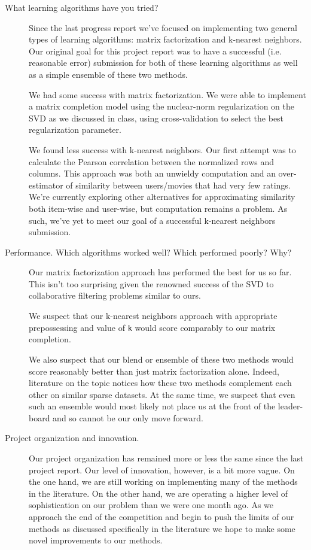 \documentclass[oneside]{article}
\begin{document}
\begin{description}
\item[What learning algorithms have you tried?] 
Since the last progress report we've focused on implementing two general types of learning algorithms: matrix factorization and k-nearest neighbors. Our original goal for this project report was to have a successful (i.e. reasonable error) submission for both of these learning algorithms as well as a simple ensemble of these two methods.

We had some success with matrix factorization. We were able to implement a matrix completion model using the nuclear-norm regularization on the SVD as we discussed in class, using cross-validation to select the best regularization parameter.

We found less success with k-nearest neighbors. Our first attempt was to calculate the Pearson correlation between the normalized rows and columns. This approach was both an unwieldy computation and an over-estimator of similarity between users/movies that had very few ratings. We're currently exploring other alternatives for approximating similarity both item-wise and user-wise, but computation remains a problem. As such, we've yet to meet our goal of a successful k-nearest neighbors submission.

\item[Performance. Which algorithms worked well? Which performed poorly? Why?]
Our matrix factorization approach has performed the best for us so far. This isn't too surprising given the renowned success of the SVD to collaborative filtering problems similar to ours. 

We suspect that our k-nearest neighbors approach with appropriate prepossessing and  value of \verb|k| would score comparably to our matrix completion. 

We also suspect that our blend or ensemble of these two methods would score reasonably better than just matrix factorization alone. Indeed, literature on the topic notices how these two methods complement each other on similar sparse datasets. At the same time, we suspect that even such an ensemble would most likely not place us at the front of the leader-board and so cannot be our only move forward. 

\item[Project organization and innovation.] 
Our project organization has remained more or less the same since the last project report. Our level of innovation, however, is a bit more vague. On the one hand, we are still working on implementing many of the methods in the literature. On the other hand, we are operating a higher level of sophistication on our problem than we were one month ago. As we approach the end of the competition and begin to push the limits of our methods as discussed specifically in the literature we hope to make some novel improvements to our methods. 


\end{description}
\end{document}
